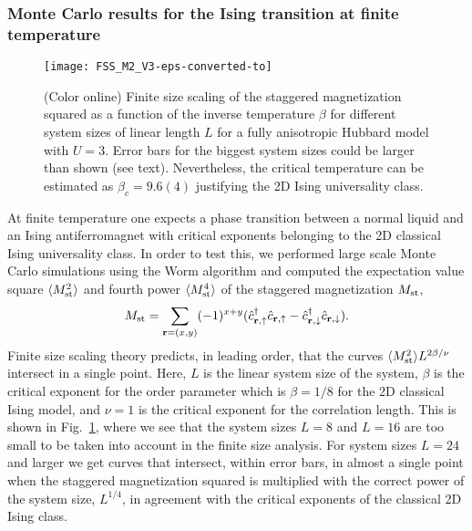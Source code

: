 \documentclass[twocolumn,superscriptaddress,pra,showpacs,longbibliography]{revtex4-1}
\newcommand{\<}{\langle}
\renewcommand{\>}{\rangle}
\begin{document}
\subsubsection{Monte Carlo results for the Ising transition at finite temperature}

\begin{figure}[t]
\texttt{[image: FSS\_M2\_V3-eps-converted-to]}
\caption{(Color online) Finite size scaling of the staggered magnetization squared as a function of the inverse temperature $\beta$ for different system sizes of linear length $L$ for a fully anisotropic Hubbard model with $U=3$. Error bars for the biggest system sizes could be larger than shown (see text). Nevertheless, the critical temperature can be estimated as $\beta_c = 9.6(4)$ justifying the 2D Ising universality class.} 
\label{fig:U3}
\end{figure}

At finite temperature one expects a phase transition between a normal liquid and an Ising antiferromagnet with critical exponents belonging to the 2D classical Ising universality class. 
In order to test this, we performed large scale Monte Carlo simulations using the Worm algorithm and computed the expectation value square $\langle M_{\rm st}^2 \rangle$ and fourth power $\langle M_{\rm st}^4 \rangle$ of the staggered magnetization $M_{\rm st}$,
\begin{equation}
M_{\rm st} = \sum_{\mathbf{r}=(x,y)} (-1)^{x+y}  ( \hat{c}^{\dagger}_{\mathbf{r}, \uparrow}  \hat{c}_{\mathbf{r} , \uparrow} - \hat{c}^{\dagger}_{\mathbf{r}, \downarrow}  \hat{c}_{\mathbf{r} , \downarrow} ).
\end{equation}
Finite size scaling theory predicts, in leading order, that the curves $\langle M_{\rm st}^2 \rangle L^{2 \beta/\nu}$ intersect in a single point. Here, $L$ is the linear system size of the system, $\beta$ is the critical exponent for the order parameter which is $\beta=1/8$ for the 2D classical Ising model, and $\nu=1$ is the critical exponent for the correlation length. This is shown in Fig.~\ref{fig:U3}, where we see that the system sizes $L=8$ and $L=16$ are too small to be taken into account in the finite size analysis. For system sizes $L=24$ and larger we get curves that intersect, within error bars, in almost a single point when the staggered magnetization squared is multiplied with the correct power of the system size, $L^{1/4}$, in agreement with the critical exponents of the classical 2D Ising class. 
\end{document}
